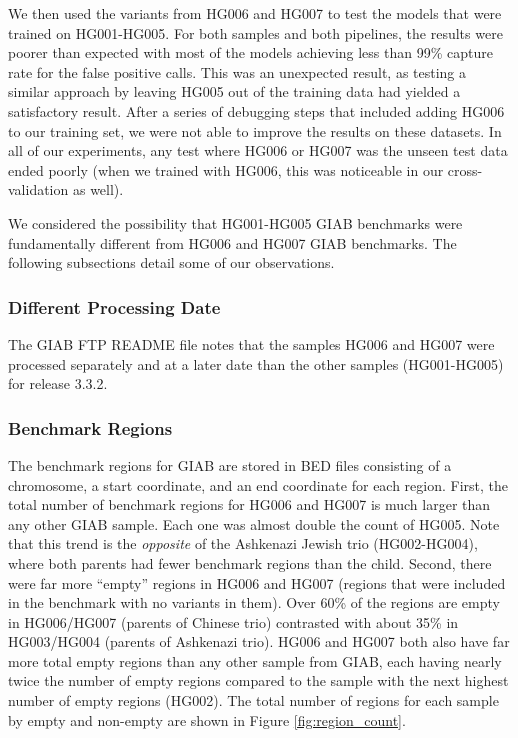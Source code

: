 We then used the variants from HG006 and HG007 to test the models that were trained on HG001-HG005.
For both samples and both pipelines, the results were poorer than expected with most of the models achieving less than 99\% capture rate for the false positive calls.
This was an unexpected result, as testing a similar approach by leaving HG005 out of the training data had yielded a satisfactory result.
After a series of debugging steps that included adding HG006 to our training set, we were not able to improve the results on these datasets.
In all of our experiments, any test where HG006 or HG007 was the unseen test data ended poorly (when we trained with HG006, this was noticeable in our cross-validation as well).

We considered the possibility that HG001-HG005 GIAB benchmarks were fundamentally different from HG006 and HG007 GIAB benchmarks.
The following subsections detail some of our observations.

\subsubsection{Different Processing Date}
The GIAB FTP README file notes that the samples HG006 and HG007 were processed separately and at a later date than the other samples (HG001-HG005) for release 3.3.2.

\subsubsection{Benchmark Regions}
The benchmark regions for GIAB are stored in BED files consisting of a chromosome, a start coordinate, and an end coordinate for each region.
First, the total number of benchmark regions for HG006 and HG007 is much larger than any other GIAB sample.
Each one was almost double the count of HG005.
Note that this trend is the \textit{opposite} of the Ashkenazi Jewish trio (HG002-HG004), where both parents had fewer benchmark regions than the child.
Second, there were far more ``empty'' regions in HG006 and HG007 (regions that were included in the benchmark with no variants in them).
Over 60\% of the regions are empty in HG006/HG007 (parents of Chinese trio) contrasted with about 35\% in HG003/HG004 (parents of Ashkenazi trio).
HG006 and HG007 both also have far more total empty regions than any other sample from GIAB, each having nearly twice the number of empty regions compared to the sample with the next highest number of empty regions (HG002).
The total number of regions for each sample by empty and non-empty are shown in Figure \ref{fig:region_count}.

